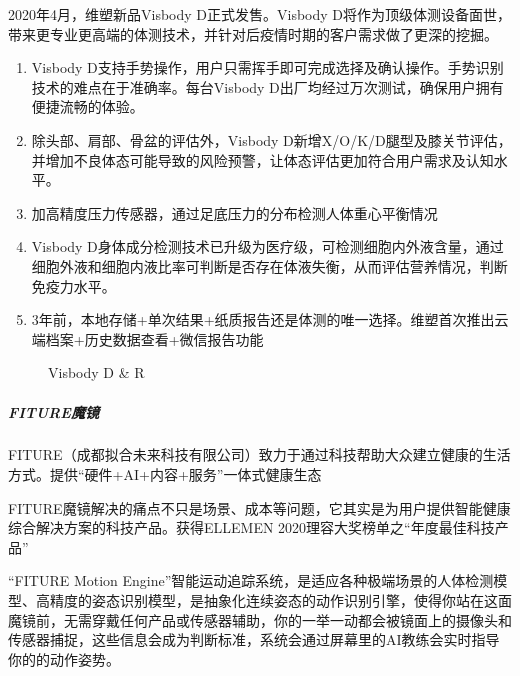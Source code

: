 \documentclass[letterpaper,11pt,english]{sphinxmanual}
\begin{document}
2020年4月，维塑新品Visbody D正式发售。Visbody
D将作为顶级体测设备面世，带来更专业更高端的体测技术，并针对后疫情时期的客户需求做了更深的挖掘。%
\begin{footnote}[694]\sphinxAtStartFootnote
{}
%
\end{footnote}
\begin{enumerate}
%
\item {} 
Visbody
D支持手势操作，用户只需挥手即可完成选择及确认操作。手势识别技术的难点在于准确率。每台Visbody
D出厂均经过万次测试，确保用户拥有便捷流畅的体验。

\item {} 
除头部、肩部、骨盆的评估外，Visbody
D新增X/O/K/D腿型及膝关节评估，并增加不良体态可能导致的风险预警，让体态评估更加符合用户需求及认知水平。

\item {} 
加高精度压力传感器，通过足底压力的分布检测人体重心平衡情况

\item {} 
Visbody
D身体成分检测技术已升级为医疗级，可检测细胞内外液含量，通过细胞外液和细胞内液比率可判断是否存在体液失衡，从而评估营养情况，判断免疫力水平。

\item {} 
3年前，本地存储+单次结果+纸质报告还是体测的唯一选择。维塑首次推出云端档案+历史数据查看+微信报告功能

\end{enumerate}

\begin{figure}[H]
\centering
\capstart

\noindent{}
\caption{Visbody D \& R}\label{\detokenize{chapter_project/AI_fit:id23}}\end{figure}


\subparagraph{FITURE魔镜}
\label{\detokenize{chapter_project/AI_fit:fiture}}
FITURE（成都拟合未来科技有限公司）致力于通过科技帮助大众建立健康的生活方式。提供“硬件+AI+内容+服务”一体式健康生态

FITURE魔镜解决的痛点不只是场景、成本等问题，它其实是为用户提供智能健康综合解决方案的科技产品。获得ELLEMEN
2020理容大奖榜单之“年度最佳科技产品”

“FITURE Motion
Engine”智能运动追踪系统，是适应各种极端场景的人体检测模型、高精度的姿态识别模型，是抽象化连续姿态的动作识别引擎，使得你站在这面魔镜前，无需穿戴任何产品或传感器辅助，你的一举一动都会被镜面上的摄像头和传感器捕捉，这些信息会成为判断标准，系统会通过屏幕里的AI教练会实时指导你的的动作姿势。
\end{document}
